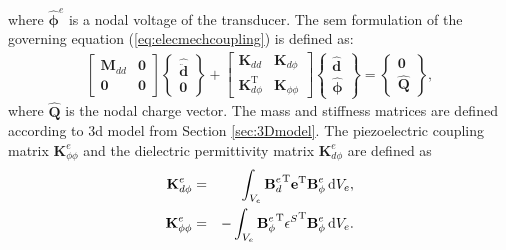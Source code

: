 where \(\widehat{\boldsymbol{\phi}}^e\) is a nodal voltage of the transducer. The \ac{sem} formulation of the governing equation (\ref{eq:elecmechcoupling}) is defined as:
\begin{eqnarray}
	\left [\begin{array}{cc}
		\textbf{M}_{dd} & \textbf{0}\\
		\textbf{0} & \textbf{0}
	\end{array}\right]
	\left \{\begin{array}{c}
		\widehat{\ddot{\textbf{d}}} \\
		\textbf{0}
	\end{array}\right \} +
	\left [\begin{array}{cc}
		\textbf{K}_{dd} & \textbf{K}_{d \phi}\\
		\textbf{K}_{d \phi}^{\mathrm{T}} & \textbf{K}_{\phi \phi}
	\end{array}\right]
	\left \{\begin{array}{c}
		\widehat{\textbf{d}} \\
		\widehat{\boldsymbol{\phi}}
	\end{array}\right \}  = 
	\left \{\begin{array}{c}
		\textbf{0}\\
		\widehat{\textbf{Q}}
	\end{array}\right \},
	\label{eq:pzt_sem}
\end{eqnarray}
%
where \(\widehat{\textbf{Q}}\) is the nodal charge vector.
The mass and stiffness matrices are defined according to \ac{3d} model from Section \ref{sec:3Dmodel}.
The piezoelectric coupling matrix \(\textbf{K}_{\phi \phi}^e\) and the dielectric permittivity matrix \(\textbf{K}_{d \phi}^e\) are defined as
\begin{eqnarray}
	\textbf{K}_{d\phi}^e & = & \int_{V_e}{\textbf{B}_d^e}^{\mathrm{T}}\textbf{e}^{\mathrm{T}} \textbf{B}_{\phi}^e \mathop{}\!\mathrm{d} V_e,\\
	\textbf{K}_{\phi \phi}^e & = & -\int_{V_e}{\textbf{B}_{\phi}^e}^{\mathrm{T}} 
	{\textbf{\(\epsilon\)}^S}^{\mathrm{T}} \textbf{B}_{\phi}^e \mathop{}\!\mathrm{d} V_e.
\end{eqnarray}

